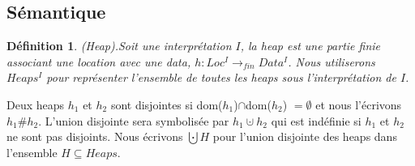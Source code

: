 \documentclass[9pt,openany]{book}
\newtheorem{definition}{D\'efinition}[section]
\begin{document}
	\subsection{S\'emantique}
	\begin{definition}
	(Heap).Soit une interpr\'etation $I$, la heap est une partie finie associant une location avec une data, $h : Loc^{I} \rightarrow_{fin} Data^{I}$. Nous utiliserons $Heaps^{I}$ pour repr\'esenter l'ensemble de toutes les heaps sous l'interpr\'etation de $I$.
	\end{definition}
	Deux heaps $h_{1}$ et $h_{2}$ sont disjointes si dom($h_{1}$)$\cap$dom($h_{2}$) $= \emptyset$ et nous l'\'ecrivons $h_{1}\#h_{2}$. L'union disjointe sera symbolis\'ee par $h_{1}\cupdot h_{2}$ qui est ind\'efinie si $h_{1}$ et $h_{2}$ ne sont pas disjoints. Nous \'ecrivons $\bigcupdot H$ pour l'union disjointe des heaps dans l'ensemble $H \subseteq Heaps$.
\end{document}
